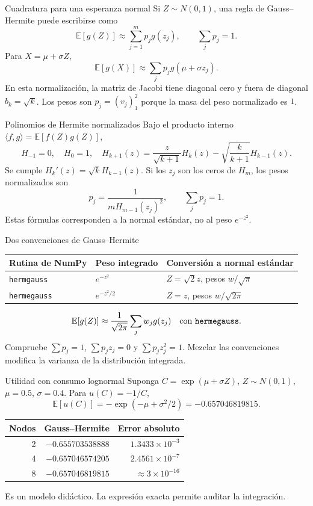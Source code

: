 \documentclass[aspectratio=169,12pt]{beamer}
\begin{document}
\begin{frame}{Cuadratura para una esperanza normal}
Si $Z\sim N(0,1)$, una regla de Gauss--Hermite puede escribirse como
\[\mathbb E[g(Z)]\approx\sum_{j=1}^m p_jg(z_j),\qquad\sum_jp_j=1.\]
Para $X=\mu+\sigma Z$,
\[\mathbb E[g(X)]\approx\sum_jp_jg(\mu+\sigma z_j).\]
En esta normalización, la matriz de Jacobi tiene diagonal cero y
fuera de diagonal $b_k=\sqrt{k}$.
Los pesos son $p_j=(v_j)_1^2$ porque la masa del peso normalizado es $1$.
\end{frame}

\begin{frame}{Polinomios de Hermite normalizados}
Bajo el producto interno $\langle f,g\rangle=\mathbb E[f(Z)g(Z)]$,
\[H_{-1}=0,\quad H_0=1,\quad
H_{k+1}(z)=\frac z{\sqrt{k+1}}H_k(z)-\sqrt{\frac{k}{k+1}}H_{k-1}(z).\]
Se cumple $H_k'(z)=\sqrt{k}H_{k-1}(z)$.
Si los $z_j$ son los ceros de $H_m$, los pesos normalizados son
\[p_j=\frac1{mH_{m-1}(z_j)^2},\qquad\sum_jp_j=1.\]
Estas fórmulas corresponden a la normal estándar, no al peso $e^{-z^2}$.
\end{frame}

\begin{frame}{Dos convenciones de Gauss--Hermite}
\small
\begin{center}\begin{tabular}{lll}\toprule
Rutina de NumPy&Peso integrado&Conversión a normal estándar\\\midrule
\texttt{hermgauss}&$e^{-z^2}$&$Z=\sqrt2z$, pesos $w/\sqrt\pi$\\
\texttt{hermegauss}&$e^{-z^2/2}$&$Z=z$, pesos $w/\sqrt{2\pi}$\\\bottomrule
\end{tabular}\end{center}
\[\mathbb E[g(Z)]\approx\frac1{\sqrt{2\pi}}\sum_jw_jg(z_j)
\quad\text{con \texttt{hermegauss}}.\]
Compruebe $\sum p_j=1$, $\sum p_jz_j=0$ y $\sum p_jz_j^2=1$.
Mezclar las convenciones modifica la varianza de la distribución integrada.
\end{frame}

\begin{frame}{Utilidad con consumo lognormal}
Suponga $C=\exp(\mu+\sigma Z)$, $Z\sim N(0,1)$, $\mu=0.5$, $\sigma=0.4$.
Para $u(C)=-1/C$,
\[\mathbb E[u(C)]=-\exp(-\mu+\sigma^2/2)=-0.657046819815.\]
\begin{center}\begin{tabular}{rrr}\toprule
Nodos&Gauss--Hermite&Error absoluto\\\midrule
2&$-0.655703538888$&$1.3433\times10^{-3}$\\
4&$-0.657046574205$&$2.4561\times10^{-7}$\\
8&$-0.657046819815$&$\approx3\times10^{-16}$\\\bottomrule
\end{tabular}\end{center}
Es un modelo didáctico. La expresión exacta permite auditar la integración.
\end{frame}
\end{document}
